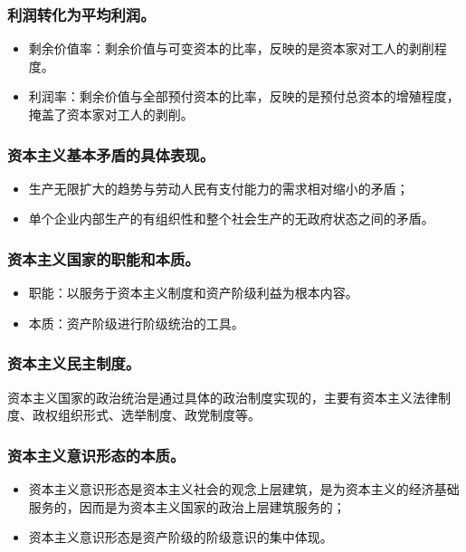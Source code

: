 \documentclass{article}
\begin{document}
\subsubsection{利润转化为平均利润。}
\begin{itemize}
    \item 剩余价值率：剩余价值与可变资本的比率，反映的是资本家对工人的剥削程度。
    \item 利润率：剩余价值与全部预付资本的比率，反映的是预付总资本的增殖程度，掩盖了资本家对工人的剥削。
\end{itemize}

\subsubsection{资本主义基本矛盾的具体表现。}
\begin{itemize}
    \item 生产无限扩大的趋势与劳动人民有支付能力的需求相对缩小的矛盾；
    \item 单个企业内部生产的有组织性和整个社会生产的无政府状态之间的矛盾。
\end{itemize}

\subsubsection{资本主义国家的职能和本质。}
\begin{itemize}
    \item 职能：以服务于资本主义制度和资产阶级利益为根本内容。
    \item 本质：资产阶级进行阶级统治的工具。
\end{itemize}

\subsubsection{资本主义民主制度。}
资本主义国家的政治统治是通过具体的政治制度实现的，主要有资本主义法律制度、政权组织形式、选举制度、政党制度等。

\subsubsection{资本主义意识形态的本质。}
\begin{itemize}
    \item 资本主义意识形态是资本主义社会的观念上层建筑，是为资本主义的经济基础服务的，因而是为资本主义国家的政治上层建筑服务的；
    \item 资本主义意识形态是资产阶级的阶级意识的集中体现。
\end{itemize}
\end{document}
